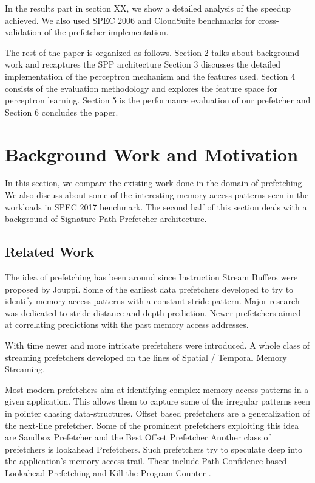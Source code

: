 \documentclass{sig-alternate}
\begin{document}
In the results part in section XX, we show a detailed analysis of the speedup achieved.
We also used SPEC 2006 and CloudSuite benchmarks for cross-validation of the prefetcher implementation.

The rest of the paper is organized as follows.
Section 2 talks about background work and recaptures the SPP architecture
Section 3 discusses the detailed implementation of the perceptron mechanism and the features used.
Section 4 consists of the evaluation methodology and explores the feature space for perceptron learning.
Section 5 is the performance evaluation of our prefetcher and Section 6 concludes the paper.

\section{Background Work and Motivation}

In this section, we compare the existing work done in the domain of prefetching. 
We also discuss about some of the interesting memory access patterns seen in the workloads in SPEC 2017 benchmark. 
The second half of this section deals with a background of Signature Path Prefetcher architecture.

\subsection{Related Work}

The idea of prefetching has been around since Instruction Stream Buffers were proposed by Jouppi.
\cite{ISB}
Some of the earliest data prefetchers developed to try to identify memory access patterns with a constant stride pattern.
\cite{Smith} 
\cite{Baer}
\cite{Stride}
Major research was dedicated to stride distance and depth prediction.
\cite{Decoupled}
\cite{Adaptive}
Newer prefetchers aimed at correlating predictions with the past memory access addresses.
\cite{Address_Correlated} 
\cite{AMPM}

With time newer and more intricate prefetchers were introduced.
\cite{Wenisch_Temporal_Streaming}
\cite{Stealth}
\cite{Feedback_Directed}
\cite{Coordinated}
\cite{Bandwidth_Efficient}
\cite{Pacman}
\cite{TLB}
\cite{Linearizing}
\cite{Sandbox}
\cite{VLDP}
\cite{DoL}
\cite{Domino}
A whole class of streaming prefetchers developed on the lines of Spatial / Temporal Memory Streaming.
\cite{Spatial_Pattern}
\cite{SMS}
\cite{Temporal_Instruction_Fetch}
\cite{Off_Chip}
\cite{STMS}
\cite{SMS_JILP}

Most modern prefetchers aim at identifying complex memory access patterns in a given application. 
This allows them to capture some of the irregular patterns seen in pointer chasing data-structures.
Offset based prefetchers are a generalization of the next-line prefetcher.
Some of the prominent prefetchers exploiting this idea are
Sandbox Prefetcher \cite{Sandbox}
and the Best Offset Prefetcher \cite{BOP}
Another class of prefetchers is lookahead Prefetchers.
Such prefetchers try to speculate deep into the application's memory access trail.
These include Path Confidence based Lookahead Prefetching \cite{SPP}
and Kill the Program Counter \cite{KPC}.
\end{document}
